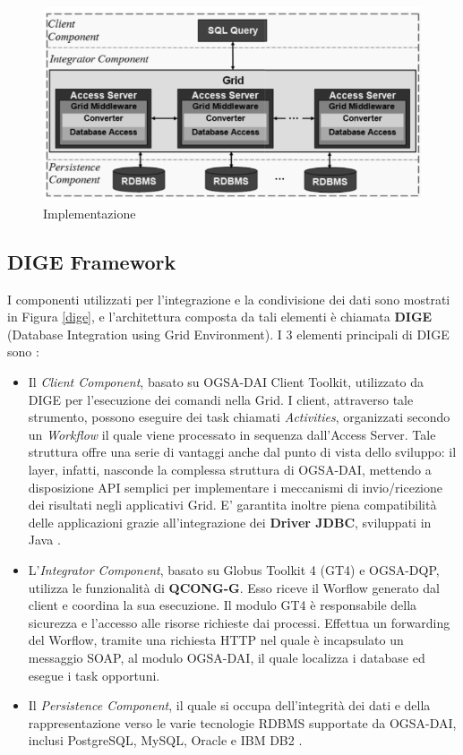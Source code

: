 \documentclass[11pt]{article}
\begin{document}
\begin{figure}[H]
	\centering
	\includegraphics[scale=0.50]{images/schemaimpl.png}
	\caption{Implementazione }
	\label{imple}
\end{figure}

\subsection{DIGE Framework}

I componenti utilizzati per l'integrazione e la condivisione dei dati sono mostrati in Figura \ref{dige}, e l'architettura composta da tali elementi è chiamata \textbf{DIGE} (Database Integration using Grid Environment). I 3 elementi principali di DIGE sono : 
\begin{itemize}
\item Il \textit{Client Component}, basato su OGSA-DAI Client Toolkit, utilizzato da DIGE per l'esecuzione dei comandi nella Grid. I client, attraverso tale strumento, possono eseguire dei task chiamati \textit{Activities}, organizzati secondo un \textit{Workflow} il quale viene processato in sequenza dall'Access Server. Tale struttura offre una serie di vantaggi anche dal punto di vista dello sviluppo: il layer, infatti, nasconde la complessa struttura di OGSA-DAI, mettendo a disposizione API semplici per implementare i meccanismi di invio/ricezione dei risultati negli applicativi Grid. E' garantita inoltre piena compatibilità delle applicazioni grazie all'integrazione dei \textbf{Driver JDBC}, sviluppati in Java \cite{archgrid}.
\item L'\textit{Integrator Component}, basato su Globus Toolkit 4 (GT4) e OGSA-DQP, utilizza le funzionalità di \textbf{QCONG-G}. Esso riceve il Worflow generato dal client e coordina la sua esecuzione. Il modulo GT4 è responsabile della sicurezza e l'accesso alle risorse richieste dai processi. Effettua un forwarding del Worflow, tramite una richiesta HTTP nel quale è incapsulato un messaggio SOAP, al modulo OGSA-DAI, il quale localizza i database ed esegue i task opportuni. 
\item Il \textit{Persistence Component}, il quale si occupa dell'integrità dei dati e della rappresentazione verso le varie tecnologie RDBMS supportate da OGSA-DAI, inclusi PostgreSQL, MySQL, Oracle e IBM DB2 \cite{archgrid}.
\end{itemize}	
\end{document}
